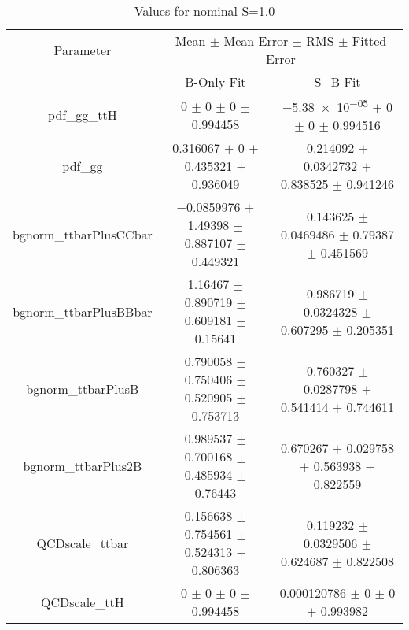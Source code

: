 \begin{table}
\centering
\caption{Values for nominal S=1.0}
\begin{tabular}{ccc}
\toprule
Parameter & \multicolumn{2}{c}{Mean $\pm$ Mean Error $\pm$ RMS $\pm$ Fitted Error}\\
 & B-Only Fit & S+B Fit\\
\midrule
pdf\_gg\_ttH & \num{0} $\pm$ \num{0} $\pm$ \num{0} $\pm$ \num{0.994458} & \num{-5.38e-05} $\pm$ \num{0} $\pm$ \num{0} $\pm$ \num{0.994516}\\
pdf\_gg & \num{0.316067} $\pm$ \num{0} $\pm$ \num{0.435321} $\pm$ \num{0.936049} & \num{0.214092} $\pm$ \num{0.0342732} $\pm$ \num{0.838525} $\pm$ \num{0.941246}\\
bgnorm\_ttbarPlusCCbar & \num{-0.0859976} $\pm$ \num{1.49398} $\pm$ \num{0.887107} $\pm$ \num{0.449321} & \num{0.143625} $\pm$ \num{0.0469486} $\pm$ \num{0.79387} $\pm$ \num{0.451569}\\
bgnorm\_ttbarPlusBBbar & \num{1.16467} $\pm$ \num{0.890719} $\pm$ \num{0.609181} $\pm$ \num{0.15641} & \num{0.986719} $\pm$ \num{0.0324328} $\pm$ \num{0.607295} $\pm$ \num{0.205351}\\
bgnorm\_ttbarPlusB & \num{0.790058} $\pm$ \num{0.750406} $\pm$ \num{0.520905} $\pm$ \num{0.753713} & \num{0.760327} $\pm$ \num{0.0287798} $\pm$ \num{0.541414} $\pm$ \num{0.744611}\\
bgnorm\_ttbarPlus2B & \num{0.989537} $\pm$ \num{0.700168} $\pm$ \num{0.485934} $\pm$ \num{0.76443} & \num{0.670267} $\pm$ \num{0.029758} $\pm$ \num{0.563938} $\pm$ \num{0.822559}\\
QCDscale\_ttbar & \num{0.156638} $\pm$ \num{0.754561} $\pm$ \num{0.524313} $\pm$ \num{0.806363} & \num{0.119232} $\pm$ \num{0.0329506} $\pm$ \num{0.624687} $\pm$ \num{0.822508}\\
QCDscale\_ttH & \num{0} $\pm$ \num{0} $\pm$ \num{0} $\pm$ \num{0.994458} & \num{0.000120786} $\pm$ \num{0} $\pm$ \num{0} $\pm$ \num{0.993982}\\
\bottomrule
\end{tabular}
\end{table}